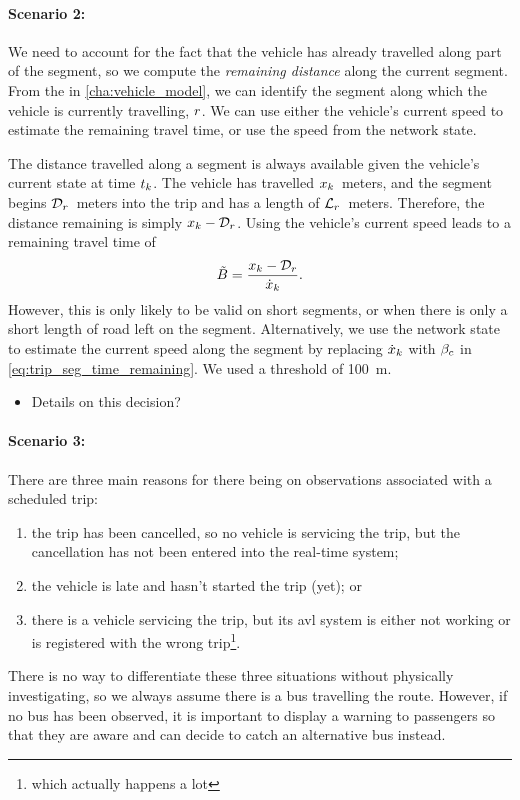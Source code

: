 \paragraph{Scenario 2:}
We need to account for the fact that the vehicle has already travelled along part of the segment, so we compute the \emph{remaining distance} along the current segment. From the \pf{} in \cref{cha:vehicle_model}, we can identify the segment along which the vehicle is currently travelling, $r$. We can use either the vehicle's current speed to estimate the remaining travel time, or use the speed from the network state.

The distance travelled along a segment is always available given the vehicle's current state at time $t_k$. The vehicle has travelled $x_k$~meters, and the segment begins $\mathcal{D}_r$~meters into the trip and has a length of $\mathcal{L}_r$~meters. Therefore, the distance remaining is simply $x_k - \mathcal{D}_r$. Using the vehicle's current speed leads to a remaining travel time of
\begin{equation}
\label{eq:trip_seg_time_remaining}
\tilde B = \frac{x_k - \mathcal{D}_r}{\dot x_k}.
\end{equation}
However, this is only likely to be valid on short segments, or when there is only a short length of road left on the segment. Alternatively, we use the network state to estimate the current speed along the segment by replacing $\dot x_k$ with $\beta_c$ in \cref{eq:trip_seg_time_remaining}.
We used a threshold of 100~m.

\begin{itemize}
\item Details on this decision?
\end{itemize}

\paragraph{Scenario 3:}
There are three main reasons for there being on observations associated with a scheduled trip:
\begin{enumerate}
\item the trip has been cancelled, so no vehicle is servicing the trip, but the cancellation has not been entered into the real-time system;
\item the vehicle is late and hasn't started the trip (yet); or
\item there is a vehicle servicing the trip, but its \gls{avl} system is either not working or is registered with the wrong trip\footnote{which actually happens a lot}.
\end{enumerate}
There is no way to differentiate these three situations without physically investigating, so we always assume there is a bus travelling the route. However, if no bus has been observed, it is important to display a warning to passengers so that they are aware and can decide to catch an alternative bus instead.

